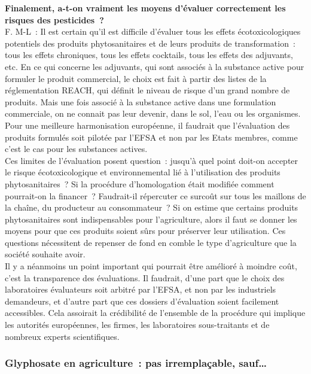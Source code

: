\documentclass[8pt]{article}
\begin{document}
\textbf{Finalement, a-t-on vraiment les moyens d’évaluer correctement les risques des pesticides~?}\\

F. M-L~: Il est certain qu’il est difficile d’évaluer tous les effets écotoxicologiques potentiels des produits phytosanitaires et de leurs produits de transformation~: tous les effets chroniques, tous les effets cocktails, tous les effets des adjuvants, etc. En ce qui concerne les adjuvants, qui sont associés à la substance active pour formuler le produit commercial, le choix est fait à partir des listes de la réglementation REACH, qui définit le niveau de risque d’un grand nombre de produits. Mais une fois associé à la substance active dans une formulation commerciale, on ne connait pas leur devenir, dans le sol, l’eau ou les organismes. Pour une meilleure harmonisation européenne, il faudrait que l’évaluation des produits formulés soit pilotée par l’EFSA et non par les Etats membres, comme c'est le cas pour les substances actives.\\

Ces limites de l’évaluation posent question~: jusqu’à quel point doit-on accepter le risque écotoxicologique et environnemental lié à l’utilisation des produits phytosanitaires~? Si la procédure d’homologation était modifiée comment pourrait-on la financer~? Faudrait-il répercuter ce surcoût sur tous les maillons de la chaîne, du producteur au consommateur~? Si on estime que certains produits phytosanitaires sont indispensables pour l’agriculture, alors il faut se donner les moyens pour que ces produits soient sûrs pour préserver leur utilisation. Ces questions nécessitent de repenser de fond en comble le type d’agriculture que la société souhaite avoir.\\

Il y a néanmoins un point important qui pourrait être amélioré à moindre coût, c’est la transparence des évaluations. Il faudrait, d’une part que le choix des laboratoires évaluateurs soit arbitré par l’EFSA, et non par les industriels demandeurs, et d’autre part que ces dossiers d’évaluation soient facilement accessibles. Cela assoirait la crédibilité de l’ensemble de la procédure qui implique les autorités européennes, les firmes, les laboratoires sous-traitants et de nombreux experts scientifiques.

\subsubsection{ Glyphosate en agriculture~: pas irremplaçable, sauf… }
\end{document}
